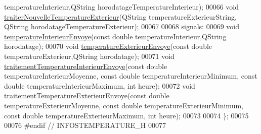 \begin{DoxyCode}
      temperatureInterieur,QString horodatageTemperatureInterieur);
00066     \textcolor{keywordtype}{void} \hyperlink{class_infos_temperature_ab8d95f48c31ca17c8690849562268420}{traiterNouvelleTemperatureExterieur}(QString 
      temperatureExterieurString, QString horodatageTemperatureExterieur);
00067 
00068   signals:
00069     \textcolor{keywordtype}{void} \hyperlink{class_infos_temperature_acaff5cc6bedc53a8bf2c914957d2ab47}{temperatureInterieurEnvoye}(\textcolor{keyword}{const} \textcolor{keywordtype}{double} temperatureInterieur,QString 
      horodatage); 
00070     \textcolor{keywordtype}{void} \hyperlink{class_infos_temperature_a6fbc9ab43714a5ba6649648c15989dee}{temperatureExterieurEnvoye}(\textcolor{keyword}{const} \textcolor{keywordtype}{double} temperatureExterieur,QString 
      horodatage); 
00071     \textcolor{keywordtype}{void} \hyperlink{class_infos_temperature_a2d7c580a215f918a79aac46a15ff24b9}{traitementTemperatureInterieurEnvoye}(\textcolor{keyword}{const} \textcolor{keywordtype}{double} 
      temperatureInterieurMoyenne, \textcolor{keyword}{const} \textcolor{keywordtype}{double} temperatureInterieurMinimum, \textcolor{keyword}{const} \textcolor{keywordtype}{double} temperatureInterieurMaximum, \textcolor{keywordtype}{int} 
      heure);
00072     \textcolor{keywordtype}{void} \hyperlink{class_infos_temperature_aaebee9d6151257fa1f182665d0fecf2c}{traitementTemperatureExterieurEnvoye}(\textcolor{keyword}{const} \textcolor{keywordtype}{double} 
      temperatureExterieurMoyenne, \textcolor{keyword}{const} \textcolor{keywordtype}{double} temperatureExterieurMinimum, \textcolor{keyword}{const} \textcolor{keywordtype}{double} temperatureExterieurMaximum, \textcolor{keywordtype}{int} 
      heure);
00073 
00074 \};
00075 
00076 \textcolor{preprocessor}{#endif // INFOSTEMPERATURE\_H}
00077 
\end{DoxyCode}

